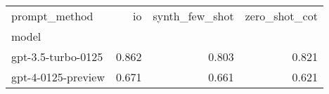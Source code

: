 \begin{tabular}{lrrr}
\toprule
prompt_method & io & synth_few_shot & zero_shot_cot \\
model &  &  &  \\
\midrule
gpt-3.5-turbo-0125 & 0.862 & 0.803 & 0.821 \\
gpt-4-0125-preview & 0.671 & 0.661 & 0.621 \\
\bottomrule
\end{tabular}
